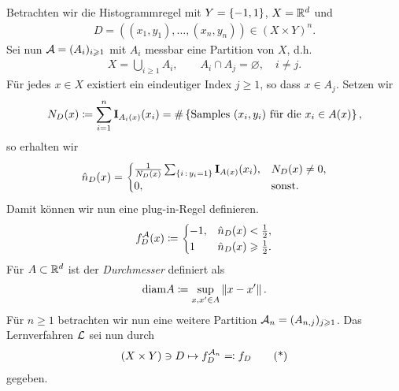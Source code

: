 Betrachten wir die Histogrammregel mit $Y=\setd{-1,1}$, $X=\R^d$ und
\begin{align*}
D=((x_1,y_1),\ldots,(x_n,y_n))\in (X\times Y)^n.
\end{align*}
Sei nun $\AA=(A_i)_{i\ge 1}$ mit $A_i$ messbar eine Partition von $X$, d.h.
\begin{align*}
X= \bigcup_{i\ge 1} A_i,\qquad A_i\cap A_j = \varnothing,\quad i\neq j. 
\end{align*}
Für jedes $x\in X$ existiert ein eindeutiger Index $j\ge 1$, so dass $x\in
A_j$. Setzen wir
\begin{align*}
N_D(x) \defl \sum_{i=1}^n \Id_{A_i(x)}(x_i) = 
\card\setd{\text{Samples }(x_i,y_i)\text{ für die }x_i\in A(x)}, 
\end{align*}
so erhalten wir
\begin{align*}
\hat{n}_D(x)
=
\begin{cases}
\frac{1}{N_D(x)}\sum_{\setdef{i}{y_i=1}} \Id_{A(x)}(x_i), & N_D(x)\neq 0,\\
0, & \text{sonst}.
\end{cases}
\end{align*}
Damit können wir nun eine plug-in-Regel definieren.
\begin{align*}
f_D^\AA(x) \defl
\begin{cases}
-1, & \hat{n}_D(x) < \frac{1}{2},\\
1 & \hat{n}_D(x) \ge \frac{1}{2}.  
\end{cases}
\end{align*}
Für $A\subset\R^d$ ist der \emph{Durchmesser} definiert als
\begin{align*}
\diam A \defl \sup_{x,x'\in A} \norm{x-x'}.
\end{align*}
Für $n\ge 1$ betrachten wir nun eine weitere Partition $\AA_n = (A_{n,j})_{j\ge
1}$. Das Lernverfahren $\LL$ sei nun durch
\begin{align*}
(X\times Y)\ni D \mapsto f_D^{\AA_n} \defr f_D\tag{*}
\end{align*}
gegeben.


